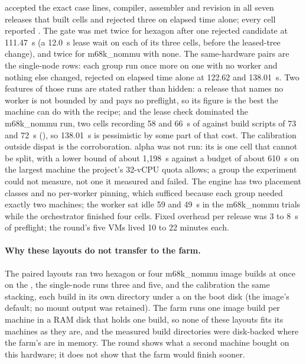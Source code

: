 accepted the exact case lines, compiler, assembler and
revision in all seven releases that built cells and rejected three on elapsed
time alone; every cell reported . The gate was met twice for
hexagon after one rejected candidate at 111.47~s (a 12.0~s lease wait on each
of its three cells, before the leased-tree change), and twice for m68k\_nommu
with none. The same-hardware pairs are the single-node rows: each group run
once more on one  with no worker and nothing else
changed, rejected on elapsed time alone at 122.62 and 138.01~s. Two features
of those runs are stated rather than hidden: a release that names no worker
is not bounded by  and pays no preflight, so its
figure is the best the machine can do with the recipe; and the lease check
dominated the m68k\_nommu run, two cells recording 58 and 66~s of
 against build scripts of 73 and 72~s
(), so 138.01~s is pessimistic by some
part of that cost. The calibration outside dispat is the corroboration. alpha
was not run: its  is one cell that cannot be split, with a
lower bound of about 1,198~s against a budget of about 610~s on the largest
machine the project's 32-vCPU quota allows; a group the experiment could not
measure, not one it measured and failed. The engine has two placement classes
and no per-worker pinning, which sufficed because each group needed exactly
two machines; the worker sat idle 59 and 49~s in the m68k\_nommu trials while
the orchestrator finished four cells. Fixed overhead per release was 3 to 8~s
of preflight; the round's five VMs lived 10 to 22 minutes each.

\paragraph{Why these layouts do not transfer to the farm.} The paired
layouts ran two hexagon or four m68k\_nommu image builds at once on the
, the single-node runs three and five, and the
calibration the same stacking, each build in its own directory under a
 on the boot disk (the image's default; no mount output was
retained). The farm runs one image build per machine in a RAM disk that holds
one build, so none of these layouts fits its machines as they are, and the
measured build directories were disk-backed where the farm's are in memory.
The round shows what a second machine bought on this hardware; it does not
show that the farm would finish sooner.

